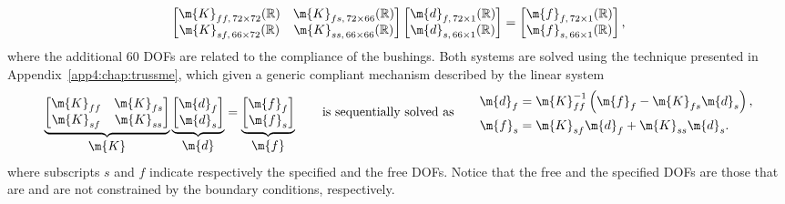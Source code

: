 \begin{equation}
  \begin{bmatrix}
    \m{K}_{ff ,\, 72 \times 72}(\mathbb{R}) & \m{K}_{fs ,\, 72 \times 66}(\mathbb{R}) \\
    \m{K}_{sf ,\, 66 \times 72}(\mathbb{R}) & \m{K}_{ss ,\, 66 \times 66}(\mathbb{R})
  \end{bmatrix} \begin{bmatrix}
    \m{d}_{f ,\, 72 \times 1}(\mathbb{R}) \\ \m{d}_{s ,\, 66 \times 1}(\mathbb{R})
  \end{bmatrix} = \begin{bmatrix}
    \m{f}_{f ,\, 72 \times 1}(\mathbb{R}) \\ \m{f}_{s ,\, 66 \times 1}(\mathbb{R})
  \end{bmatrix}
  \text{,}
\end{equation}
%
where the additional 60 \acp{DOF} are related to the compliance of the bushings. Both systems are solved using the technique presented in Appendix~\ref{app4:chap:trussme}, which given a generic compliant mechanism described by the linear system
%
\begin{equation}
  \label{chap4:eq:macrofe}
  \underbrace{\begin{bmatrix}
    \m{K}_{ff} & \m{K}_{fs} \\
    \m{K}_{sf} & \m{K}_{ss}
  \end{bmatrix}}_{\textstyle\m{K}} \underbrace{\begin{bmatrix}
    \m{d}_{f} \\ \m{d}_{s}
  \end{bmatrix}}_{\textstyle\m{d}} = \underbrace{\begin{bmatrix}
    \m{f}_{f} \\ \m{f}_{s}
  \end{bmatrix}}_{\textstyle\m{f}}
  \qquad \text{is sequentially solved as} \qquad
  \begin{aligned}
    \m{d}_{f} &= \m{K}_{ff}^{-1}\left(\m{f}_{f} - \m{K}_{fs}\m{d}_{s}\right) \text{,} \\
    \m{f}_{s} &= \m{K}_{sf}\m{d}_{f} + \m{K}_{ss}\m{d}_{s} \text{.}
  \end{aligned}
\end{equation}
%
where subscripts $s$ and $f$ indicate respectively the specified and the free \acp{DOF}. Notice that the free and the specified \acp{DOF} are those that are and are not constrained by the boundary conditions, respectively.

